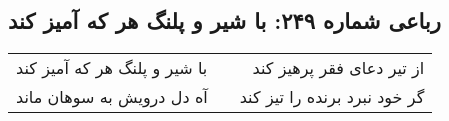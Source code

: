 \begin{center}
\section*{رباعی شماره ۲۴۹: با شیر و پلنگ هر که آمیز کند}
\label{sec:sh249}
\begin{longtable}{l p{0.5cm} r}
با شیر و پلنگ هر که آمیز کند
&&
از تیر دعای فقر پرهیز کند
\\
آه دل درویش به سوهان ماند
&&
گر خود نبرد برنده را تیز کند
\\
\end{longtable}
\end{center}
